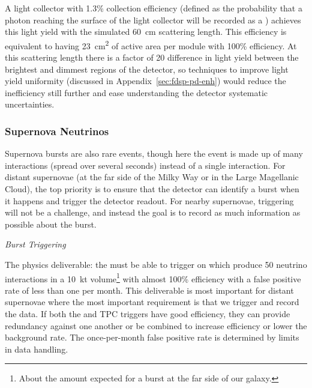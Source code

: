 A light collector with 1.3\% collection efficiency (defined as the probability that a photon reaching the surface of the light collector will be recorded as a \phel) achieves this light yield with the simulated \SI{60}{cm} scattering length. This efficiency is equivalent to having \SI{23}{cm^2} of active area per module with 100\% efficiency. At this scattering length there is a factor of 20 difference in light yield between the brightest and dimmest regions of the detector, so techniques to improve light yield uniformity (discussed in Appendix~\ref{sec:fdsp-pd-enh}) would reduce the inefficiency still further and ease understanding the detector systematic uncertainties.


\subsubsection{Supernova Neutrinos}
\label{subsec:fdsp-pd-simphys-snb}

Supernova bursts are also rare events, though here the event is made up of many interactions (spread over several seconds) instead of a single interaction. For distant supernovae (at the far side of the Milky Way or in the Large Magellanic Cloud), the top priority is to ensure that the detector can identify a burst when it happens and trigger the detector readout. For nearby supernovae, triggering will not be a challenge, and instead the goal is to record as much information as possible about the burst.

\textit{Burst Triggering}\nopagebreak

The physics deliverable: the  must be able to trigger on  which produce 50 neutrino interactions in a \SI{10}{kt} volume\footnote{About the amount expected for a burst at the far side of our galaxy.} with almost 100\% efficiency with a false positive rate of less than one per month. This deliverable is most important for distant supernovae where the most important requirement is that we trigger and record the data. If both the  and TPC triggers have good efficiency, they can provide redundancy against one another or be combined to increase efficiency or lower the background rate. The once-per-month false positive rate is determined by limits in data handling.

